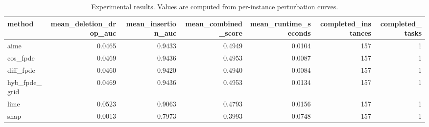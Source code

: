 \begin{table}[t]
\caption{Experimental results. Values are computed from per-instance perturbation curves.}
\label{tab:main_results_computed}
\centering
\begin{tabular}{lrrrrrr}
\toprule
method & mean\_deletion\_drop\_auc & mean\_insertion\_auc & mean\_combined\_score & mean\_runtime\_seconds & completed\_instances & completed\_tasks \\
\midrule
aime & 0.0465 & 0.9433 & 0.4949 & 0.0104 & 157 & 1 \\
cos\_fpde & 0.0469 & 0.9436 & 0.4953 & 0.0087 & 157 & 1 \\
diff\_fpde & 0.0460 & 0.9420 & 0.4940 & 0.0084 & 157 & 1 \\
hyb\_fpde\_grid & 0.0469 & 0.9436 & 0.4953 & 0.0134 & 157 & 1 \\
lime & 0.0523 & 0.9063 & 0.4793 & 0.0156 & 157 & 1 \\
shap & 0.0013 & 0.7973 & 0.3993 & 0.0748 & 157 & 1 \\
\bottomrule
\end{tabular}

\end{table}
